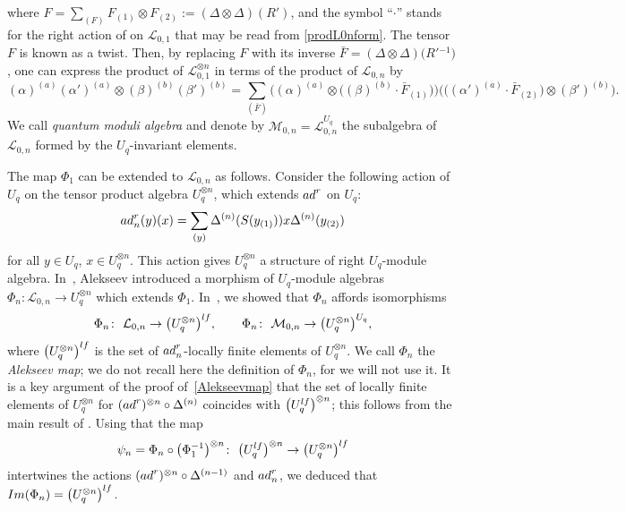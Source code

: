 \documentclass[11pt]{article}
\numberwithin{equation}{section}
\numberwithin{equation}{section}
\theoremstyle{definition}
\newcommand{\mUq}{\mathbb{U}_q}
\newcommand{\Ll}{{\mathcal L}}
\newcommand{\Mm}{{\mathcal M}}
\newcommand{\ra}{\rightarrow}
\begin{document}
where $F=\sum_{(F)} F_{(1)}\otimes F_{(2)} := (\Delta \otimes \Delta)(R')$, and the symbol ``$\cdot$'' stands for the right action of \smash{$\mUq^{\hat \otimes 2}$} on $\Ll_{0,1}$ that may be read from \eqref{prodL0nform}. The tensor $F$ is known as a twist. Then, by replacing $F$ with its inverse $\bar{F} = (\Delta \otimes \Delta)\big(R'{}^{-1}\big)$, one can express the product of
$\Ll_{0,1}^{\otimes n}$ in terms of the product of $\Ll_{0,n}$ by
\begin{equation}\label{prodL0nform3}
(\alpha)^{(a)}(\alpha')^{(a)}\otimes (\beta)^{(b)}(\beta')^{(b)} = \sum_{(\bar{F})}\big((\alpha)^{(a)}\otimes
 \big((\beta)^{(b)}\cdot \bar{F}_{(1)}\big)\big) \big( \big((\alpha')^{(a)}\cdot \bar{F}_{(2)}\big)\otimes (\beta')^{(b)}\big).
\end{equation}
 We call {\it quantum moduli algebra} and denote by $\Mm_{0,n} = {\mathcal L}_{0,n}^{U_q}$ the subalgebra of $\Ll_{0,n}$ formed by the $U_q$-invariant elements.


The map $\Phi_1$ can be extended to $\Ll_{0,n}$ as follows. Consider the following action of $U_q$ on the tensor product algebra $U_q^{{\otimes} n}$, which extends ${\rm ad}^r$ on $U_q$:
\[%
{\rm ad}_n^r(y)(x) = \sum_{(y)}\Delta^{(n)}({S}(y_{(1)})) x \Delta^{(n)}(y_{(2)})
\]
for all $y \in U_q$, $x \in U_q^{{\otimes} n}$. This action gives $U_q^{{\otimes} n}$ a structure of right $U_q$-module algebra. In~\cite{A}, Alekseev introduced a morphism of $U_q$-module algebras $\Phi_n\colon \Ll_{0,n} \ra U_q^{\otimes n}$ which extends $\Phi_1$. In~\cite[Proposition~6.7]{BR}, we showed that $\Phi_n$ affords isomorphisms
\begin{equation}\label{Alekseevmap}
\Phi_n\colon\ \Ll_{0,n} \ra \big(U_q^{\otimes n}\big)^{\rm lf},\qquad \Phi_n\colon\ \Mm_{0,n}\rightarrow \big(U_q^{{\otimes} n}\big)^{U_q},
\end{equation}
where $\big(U_q^{\otimes n}\big)^{\rm lf}$ is the set of ${\rm ad}_n^r$-locally finite elements of $U_q^{{\otimes} n}$. We call $\Phi_n$ the {\it Alekseev map}; we do not recall here the definition of $\Phi_n$, for we will not use it. It is a key argument of the proof of~\eqref{Alekseevmap} that the set of locally finite elements of $U_q^{{\otimes} n}$ for $({\rm ad}^r)^{\otimes n}\circ \Delta^{(n)}$ coincides with $\big(U_q^{\rm lf}\big)^{\otimes n}$; this follows from the main result of \cite{KLNY}. Using that the map
\begin{equation}\label{Phipsi}
\psi_n = \Phi_n \circ \big(\Phi_1^{-1}\big)^{\otimes n}\colon\ \big(U_q^{\rm lf}\big)^{\otimes n}\ra \big(U_q^{\otimes n}\big)^{\rm lf}
\end{equation}
intertwines the actions $({\rm ad}^r)^{\otimes n}\circ \Delta^{(n-1)}$ and ${\rm ad}_n^r$, we deduced that ${\rm Im}(\Phi_n) = \big(U_q^{\otimes n}\big)^{\rm lf}$.
\end{document}
